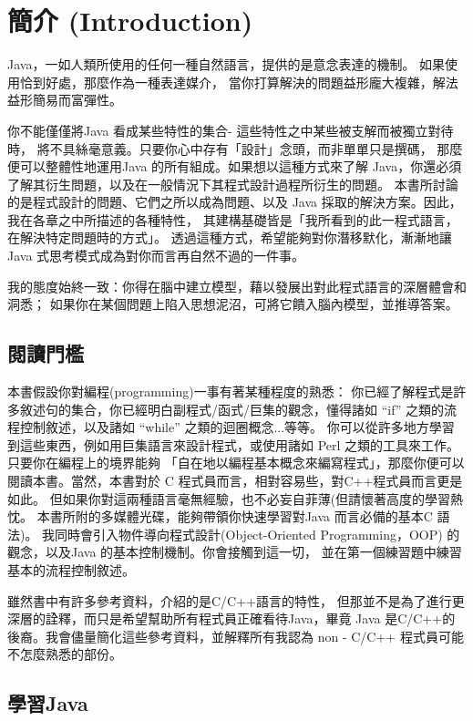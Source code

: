 \chapter{簡介 (Introduction)}
Java，一如人類所使用的任何一種自然語言，提供的是意念表達的機制。
如果使用恰到好處，那麼作為一種表達媒介，
當你打算解決的問題益形龐大複雜，解法益形簡易而富彈性。

你不能僅僅將Java 看成某些特性的集合- 這些特性之中某些被支解而被獨立對待時，
將不具絲毫意義。只要你心中存有「設計」念頭，而非單單只是撰碼，
那麼便可以整體性地運用Java 的所有組成。如果想以這種方式來了解
Java，你還必須了解其衍生問題，以及在一般情況下其程式設計過程所衍生的問題。
本書所討論的是程式設計的問題、它們之所以成為問題、以及
Java 採取的解決方案。因此，我在各章之中所描述的各種特性，
其建構基礎皆是「我所看到的此一程式語言，在解決特定問題時的方式」。
透過這種方式，希望能夠對你潛移默化，漸漸地讓
Java 式思考模式成為對你而言再自然不過的一件事。

我的態度始終一致：你得在腦中建立模型，藉以發展出對此程式語言的深層體會和洞悉；
如果你在某個問題上陷入思想泥沼，可將它饋入腦內模型，並推導答案。
\section{閱讀門檻}
本書假設你對編程(programming)一事有著某種程度的熟悉：
你已經了解程式是許多敘述句的集合，你已經明白副程式/函式/巨集的觀念，懂得諸如
``if'' 之類的流程控制敘述，以及諸如 ``while'' 之類的迴圈概念...等等。
你可以從許多地方學習到這些東西，例如用巨集語言來設計程式，或使用諸如
Perl 之類的工具來工作。只要你在編程上的境界能夠
「自在地以編程基本概念來編寫程式」，那麼你便可以閱讀本書。當然，本書對於
C 程式員而言，相對容易些，對C++程式員而言更是如此。
但如果你對這兩種語言毫無經驗，也不必妄自菲薄(但請懷著高度的學習熱忱。
本書所附的多媒體光碟，能夠帶領你快速學習對Java 而言必備的基本C 語法)。
我同時會引入物件導向程式設計(Object-Oriented Programming，OOP)
的觀念，以及Java 的基本控制機制。你會接觸到這一切，
並在第一個練習題中練習基本的流程控制敘述。

雖然書中有許多參考資料，介紹的是C/C++語言的特性，
但那並不是為了進行更深層的詮釋，而只是希望幫助所有程式員正確看待Java，畢竟
Java 是C/C++的後裔。我會儘量簡化這些參考資料，並解釋所有我認為
non - C/C++ 程式員可能不怎麼熟悉的部份。

\section{學習Java}

